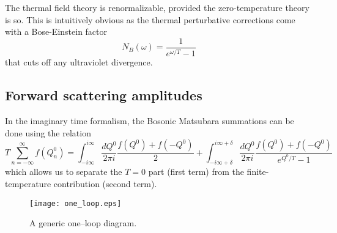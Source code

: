 \documentclass[longbibliography,groupedaddress,showpacs,showkeys,amssymb,eqsecnum,aps,nofootinbib,superscriptaddress]{revtex4}
\newcommand{\be}{\begin{equation}}
\newcommand{\ee}{\end{equation}}
\begin{document}
The thermal field theory is renormalizable, provided the 
zero-temperature theory is so. 
This is intuitively obvious as the thermal perturbative corrections come with 
a Bose-Einstein factor 
\be\label{e7}
N_B(\omega) = \frac{1}{e^{\omega/T}-1}
\ee
that cuts off any ultraviolet divergence. 

\subsection{Forward scattering amplitudes}

In the imaginary time formalism, the Bosonic Matsubara summations 
can be done 
% 
using the relation \cite{kapusta}
\be\label{e8}
T \sum_{n=-\infty}^{\infty} f(Q^0_n) =
\int_{-i\infty}^{i\infty} \frac{dQ^0}{2\pi i} \frac{f(Q^0)+f(-Q^0)}{2}
+
\int_{-i\infty+\delta}^{i\infty+\delta} \frac{dQ^0}{2\pi i} 
\frac{f(Q^0)+f(-Q^0)}{e^{Q^0/T}-1}
\ee 
which allows us to separate the $T=0$ part (first term) 
from the finite-temperature contribution (second term).  

\begin{figure}[t]
%
    \texttt{[image: one\_loop.eps]}
    \caption{A generic one--loop diagram.}\label{fig1}
\end{figure}
\end{document}
